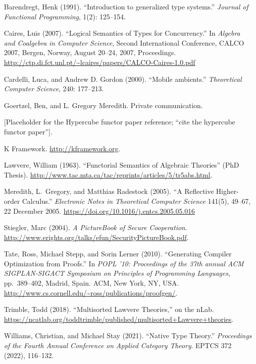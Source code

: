 \documentclass{article}
\begin{document}
\begin{thebibliography}{99}

Barendregt, Henk (1991). 
``Introduction to generalized type systems.''  
\emph{Journal of Functional Programming}, 1(2): 125--154.

Caires, Luis (2007). 
``Logical Semantics of Types for Concurrency.'' 
In \emph{Algebra and Coalgebra in Computer Science}, 
Second International Conference, CALCO 2007, Bergen, Norway, August 20--24, 2007, Proceedings.
\url{http://ctp.di.fct.unl.pt/~lcaires/papers/CALCO-Caires-1.0.pdf}

Cardelli, Luca, and Andrew D. Gordon (2000). ``Mobile ambients.'' \emph{Theoretical Computer Science}, 240: 177--213.

Goertzel, Ben, and L. Gregory Meredith. Private communication.

[Placeholder for the Hypercube functor paper reference; “cite the hypercube functor paper”].

K Framework.
\url{http://kframework.org}.

Lawvere, William (1963). 
``Functorial Semantics of Algebraic Theories'' (PhD Thesis). 
\url{http://www.tac.mta.ca/tac/reprints/articles/5/tr5abs.html}.

Meredith, L.~Gregory, and Matthias Radestock (2005). 
``A Reflective Higher-order Calculus.'' 
\emph{Electronic Notes in Theoretical Computer Science} 141(5), 49--67, 22 December 2005. 
\url{https://doi.org/10.1016/j.entcs.2005.05.016}

Stiegler, Marc (2004). \emph{A PictureBook of Secure Cooperation}. \url{http://www.erights.org/talks/efun/SecurityPictureBook.pdf}.

Tate, Ross, Michael Stepp, and Sorin Lerner (2010). 
``Generating Compiler Optimization from Proofs.'' 
In \emph{POPL '10: Proceedings of the 37th annual ACM SIGPLAN-SIGACT Symposium on Principles of Programming Languages}, 
pp.\ 389--402, Madrid, Spain. 
ACM, New York, NY, USA. 
\url{http://www.cs.cornell.edu/~ross/publications/proofgen/}.

Trimble, Todd (2018). 
``Multisorted Lawvere Theories,'' on the nLab. 
\url{https://ncatlab.org/toddtrimble/published/multisorted+Lawvere+theories}.

Williams, Christian, and Michael Stay (2021). ``Native Type Theory.'' \emph{Proceedings of the Fourth Annual Conference on Applied Category Theory}. EPTCS 372 (2022), 116--132.

\end{thebibliography}
\end{document}

